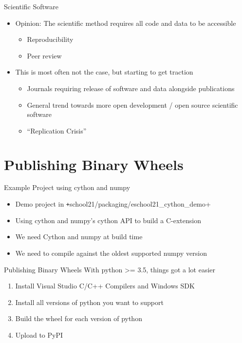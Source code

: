 \begin{frame}[c]{Scientific Software}
  \begin{itemize}
    \item Opinion: The scientific method requires all code and data to be accessible
      \begin{itemize}
        \item Reproducibility
        \item Peer review
      \end{itemize}
    \item This is most often not the case, but starting to get traction
      \begin{itemize}
        \item Journals requiring release of software and data alongside publications
        \item General trend towards more open development / open source scientific software
        \item \enquote{Replication Crisis}
      \end{itemize}
  \end{itemize}
\end{frame}

\section{Publishing Binary Wheels}

\begin{frame}[c]{Example Project using cython and numpy}
  \begin{itemize}
    \item Demo project in \texttt+school21/packaging/eschool21_cython_demo+
    \item Using cython and numpy's cython API to build a C-extension
    \item We need Cython and numpy at build time
    \item We need to compile against the oldest supported numpy version
  \end{itemize}
\end{frame}

\begin{frame}[c]{Publishing Binary Wheels}
  With python >= 3.5, things got a lot easier
  \begin{enumerate}
    \item Install Visual Studio C/C++ Compilers and Windows SDK
    \item Install all versions of python you want to support
    \item Build the wheel for each version of python
    \item Upload to PyPI
  \end{enumerate}
\end{frame}


